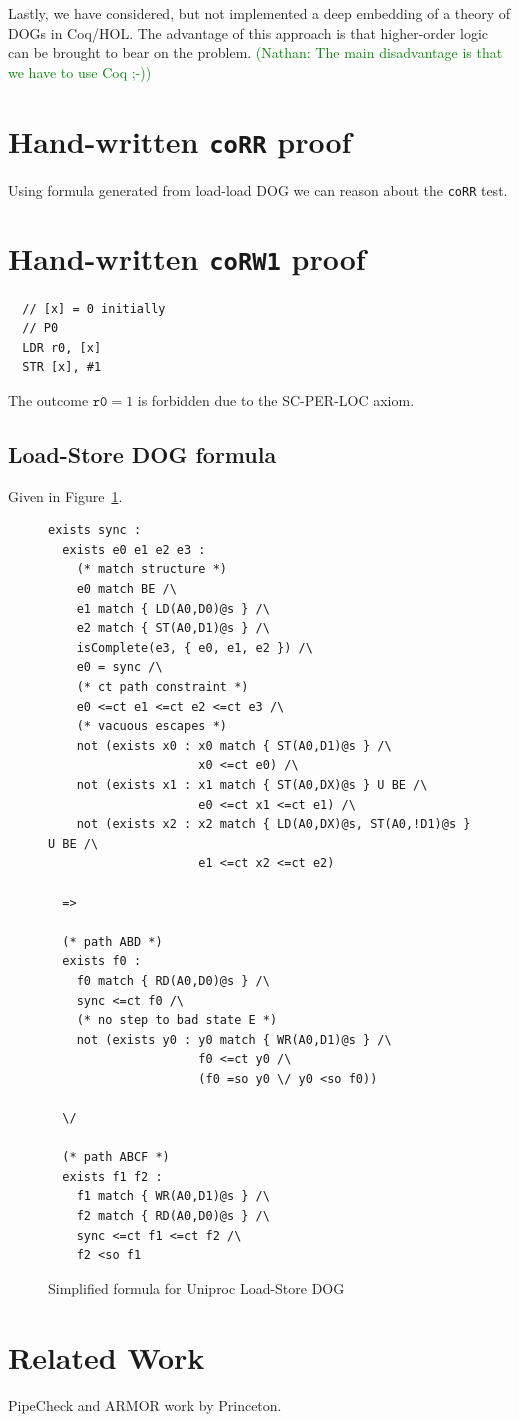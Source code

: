 \documentclass[10pt]{paper}
\newcommand{\axiom}[1]{\textsc{#1}}
\newcommand{\litmus}[1]{\texttt{#1}}
\newcommand{\NCComment}[1]{\textcolor{green}{(Nathan: #1)}}
\begin{document}
Lastly, we have considered, but not implemented a deep embedding of a theory of DOGs in Coq/HOL.
%
The advantage of this approach is that higher-order logic can be brought to bear on the problem.
%
\NCComment{The main disadvantage is that we have to use Coq ;-)}

\section{Hand-written \litmus{coRR} proof}
%
Using formula generated from load-load DOG we can reason about the \litmus{coRR} test.

\section{Hand-written \litmus{coRW1} proof}

\begin{verbatim}
  // [x] = 0 initially
  // P0
  LDR r0, [x]
  STR [x], #1
\end{verbatim}

The outcome $\texttt{r0} = 1$ is forbidden due to the \axiom{SC-PER-LOC} axiom.

\subsection{Load-Store DOG formula}

Given in Figure~\ref{fig:loadstore-formula}.

\begin{figure}[p]
\begin{verbatim}
exists sync :
  exists e0 e1 e2 e3 :
    (* match structure *)
    e0 match BE /\
    e1 match { LD(A0,D0)@s } /\
    e2 match { ST(A0,D1)@s } /\
    isComplete(e3, { e0, e1, e2 }) /\
    e0 = sync /\
    (* ct path constraint *)
    e0 <=ct e1 <=ct e2 <=ct e3 /\
    (* vacuous escapes *)
    not (exists x0 : x0 match { ST(A0,D1)@s } /\
                     x0 <=ct e0) /\
    not (exists x1 : x1 match { ST(A0,DX)@s } U BE /\
                     e0 <=ct x1 <=ct e1) /\
    not (exists x2 : x2 match { LD(A0,DX)@s, ST(A0,!D1)@s } U BE /\
                     e1 <=ct x2 <=ct e2)

  =>

  (* path ABD *)
  exists f0 :
    f0 match { RD(A0,D0)@s } /\
    sync <=ct f0 /\
    (* no step to bad state E *)
    not (exists y0 : y0 match { WR(A0,D1)@s } /\
                     f0 <=ct y0 /\
                     (f0 =so y0 \/ y0 <so f0))

  \/

  (* path ABCF *)
  exists f1 f2 :
    f1 match { WR(A0,D1)@s } /\
    f2 match { RD(A0,D0)@s } /\
    sync <=ct f1 <=ct f2 /\
    f2 <so f1
\end{verbatim}
\caption{Simplified formula for Uniproc Load-Store DOG}
\label{fig:loadstore-formula}
\end{figure}

\section{Related Work}

PipeCheck and ARMOR work by Princeton.



\end{document}
